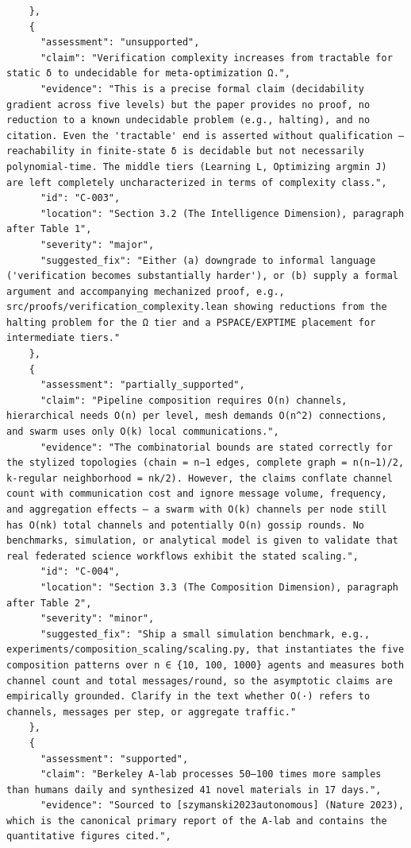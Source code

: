\documentclass[11pt]{article}
\begin{document}
\begin{verbatim}
    },
    {
      "assessment": "unsupported",
      "claim": "Verification complexity increases from tractable for static δ to undecidable for meta-optimization Ω.",
      "evidence": "This is a precise formal claim (decidability gradient across five levels) but the paper provides no proof, no reduction to a known undecidable problem (e.g., halting), and no citation. Even the 'tractable' end is asserted without qualification — reachability in finite-state δ is decidable but not necessarily polynomial-time. The middle tiers (Learning L, Optimizing argmin J) are left completely uncharacterized in terms of complexity class.",
      "id": "C-003",
      "location": "Section 3.2 (The Intelligence Dimension), paragraph after Table 1",
      "severity": "major",
      "suggested_fix": "Either (a) downgrade to informal language ('verification becomes substantially harder'), or (b) supply a formal argument and accompanying mechanized proof, e.g., src/proofs/verification_complexity.lean showing reductions from the halting problem for the Ω tier and a PSPACE/EXPTIME placement for intermediate tiers."
    },
    {
      "assessment": "partially_supported",
      "claim": "Pipeline composition requires O(n) channels, hierarchical needs O(n) per level, mesh demands O(n^2) connections, and swarm uses only O(k) local communications.",
      "evidence": "The combinatorial bounds are stated correctly for the stylized topologies (chain = n−1 edges, complete graph = n(n−1)/2, k-regular neighborhood = nk/2). However, the claims conflate channel count with communication cost and ignore message volume, frequency, and aggregation effects — a swarm with O(k) channels per node still has O(nk) total channels and potentially O(n) gossip rounds. No benchmarks, simulation, or analytical model is given to validate that real federated science workflows exhibit the stated scaling.",
      "id": "C-004",
      "location": "Section 3.3 (The Composition Dimension), paragraph after Table 2",
      "severity": "minor",
      "suggested_fix": "Ship a small simulation benchmark, e.g., experiments/composition_scaling/scaling.py, that instantiates the five composition patterns over n ∈ {10, 100, 1000} agents and measures both channel count and total messages/round, so the asymptotic claims are empirically grounded. Clarify in the text whether O(·) refers to channels, messages per step, or aggregate traffic."
    },
    {
      "assessment": "supported",
      "claim": "Berkeley A-lab processes 50–100 times more samples than humans daily and synthesized 41 novel materials in 17 days.",
      "evidence": "Sourced to [szymanski2023autonomous] (Nature 2023), which is the canonical primary report of the A-lab and contains the quantitative figures cited.",

\end{verbatim}
\end{document}

